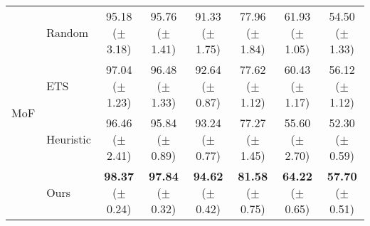\begin{table}[t]
{\begin{tabular}{l l c c c c c c}
    \multirow{4}{*}{MoF} & Random & 95.18 {\scriptsize ($\pm$ 3.18)} & 95.76 {\scriptsize ($\pm$ 1.41)}  & 91.33 {\scriptsize ($\pm$ 1.75)} & 77.96 {\scriptsize ($\pm$ 1.84)} & 61.93 {\scriptsize ($\pm$ 1.05)} & 54.50 {\scriptsize ($\pm$ 1.33)} \\ 
     & ETS & 97.04 {\scriptsize ($\pm$ 1.23)} & 96.48 {\scriptsize ($\pm$ 1.33)} & 92.64 {\scriptsize ($\pm$ 0.87)} & 77.62 {\scriptsize ($\pm$ 1.12)} & 60.43 {\scriptsize ($\pm$ 1.17)} & 56.12 {\scriptsize ($\pm$ 1.12)} \\
     & Heuristic & 96.46 {\scriptsize ($\pm$ 2.41)} &  95.84 {\scriptsize ($\pm$ 0.89)} & 93.24 {\scriptsize ($\pm$ 0.77)} & 77.27 {\scriptsize ($\pm$ 1.45)} & 55.60 {\scriptsize ($\pm$ 2.70)} & 52.30 {\scriptsize ($\pm$ 0.59)} \\
     & Ours & {\bf 98.37} {\scriptsize ($\pm$ 0.24)} & {\bf 97.84} {\scriptsize ($\pm$ 0.32)} & {\bf 94.62} {\scriptsize ($\pm$ 0.42)} & {\bf 81.58} {\scriptsize ($\pm$ 0.75)} & {\bf 64.22} {\scriptsize ($\pm$ 0.65)} & {\bf 57.70} {\scriptsize ($\pm$ 0.51)} \\
    \bottomrule
\end{tabular}
}
\vspace{-3mm}
\label{tab:results_memory_selection_methods}
\end{table}

